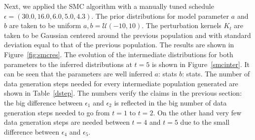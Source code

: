 \documentclass[12pt,a4paper,titlepage]{article}
\begin{document}
Next, we applied the SMC algorithm with a manually tuned schedule $\epsilon = (30.0, 16.0, 6.0, \allowbreak5.0, 4.3)$. The prior distributions for model parameter $a$ and $b$ are taken to be uniform $a, b = \mathcal{U}(-10, 10)$. The perturbation kernels $K_{t}$ are taken to be Gaussian centered around the previous population and with standard deviation equal to that of the previous population. The results are shown in Figure~\ref{fig:smcres}. The evolution of the intermediate distributions for both parameters to the inferred distributions at $t=5$ is shown in Figure~\ref{smcinter}. It can be seen that the parameters are well inferred $a$: stats $b$: stats. The number of data generation steps needed for every intermediate population generated are shown in Table~\ref{dstep}. The numbers verify the claims in the previous section: the big difference between $\epsilon_{1}$ and $\epsilon_{2}$ is reflected in the big number of data generation steps needed to go from $t=1$ to $t=2$. On the other hand very few data generation steps are needed between $t=4$ and $t=5$ due to the small difference between $\epsilon_{4}$ and $\epsilon_{5}$.
\end{document}

